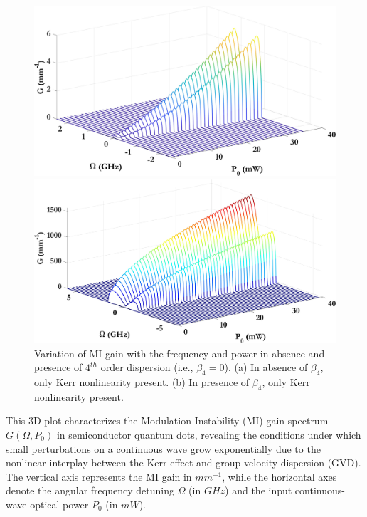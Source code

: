 \documentclass[12pt,a4paper]{article}
\begin{document}
\begin{figure}[h]
  \centering
  \begin{minipage}{0.48\textwidth}
    \centering
    \includegraphics[width=\linewidth]{Plots/Beta2_Kerr.jpeg}
    \subcaption{}
  \end{minipage}%
  \hfill
  \begin{minipage}{0.48\textwidth}
    \centering
    \includegraphics[width=\linewidth]{Plots/Beta4_Kerr.jpeg}
    \subcaption{}
  \end{minipage}
  \caption{Variation of MI gain with the frequency and power in absence and presence of $4^{th}$ order dispersion (i.e., $\beta_4=0$). (a) In absence of $\beta_4$, only Kerr nonlinearity present. (b) In presence of $\beta_4$, only Kerr nonlinearity present.}
  \label{fig:waterfall}
 \end{figure}
This 3D plot characterizes the Modulation Instability \cite{lighthall} (MI) gain spectrum \( G(\Omega, P_0) \) in semiconductor quantum dots, revealing the conditions under which small perturbations on a continuous wave grow exponentially due to the nonlinear interplay between the Kerr effect and group velocity dispersion (GVD). The vertical axis represents the MI gain in ${mm^{-1}}$, while the horizontal axes denote the angular frequency detuning \( \Omega \) (in ${GHz}$) and the input continuous-wave optical power \( P_0 \) (in ${mW}$).
\end{document}
